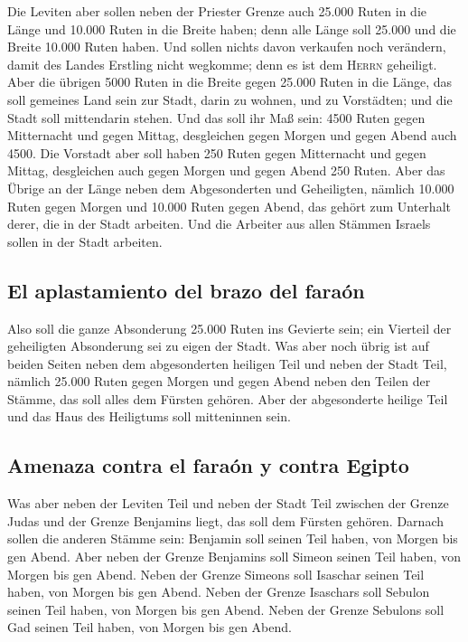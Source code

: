  Die Leviten aber sollen neben der Priester Grenze auch
25.000 Ruten in die Länge und 10.000 Ruten in die Breite haben; denn
alle Länge soll 25.000 und die Breite 10.000 Ruten haben.
 Und sollen nichts davon verkaufen noch verändern, damit
des Landes Erstling nicht wegkomme; denn es ist dem \textsc{Herrn}
geheiligt.  Aber die übrigen 5000 Ruten in die Breite
gegen 25.000 Ruten in die Länge, das soll gemeines Land sein zur Stadt,
darin zu wohnen, und zu Vorstädten; und die Stadt soll mittendarin
stehen.  Und das soll ihr Maß sein: 4500 Ruten gegen
Mitternacht und gegen Mittag, desgleichen gegen Morgen und gegen Abend
auch 4500.  Die Vorstadt aber soll haben 250 Ruten gegen
Mitternacht und gegen Mittag, desgleichen auch gegen Morgen und gegen
Abend 250 Ruten.  Aber das Übrige an der Länge neben dem
Abgesonderten und Geheiligten, nämlich 10.000 Ruten gegen Morgen und
10.000 Ruten gegen Abend, das gehört zum Unterhalt derer, die in der
Stadt arbeiten.  Und die Arbeiter aus allen Stämmen
Israels sollen in der Stadt arbeiten.

\hypertarget{el-aplastamiento-del-brazo-del-farauxf3n}{%
\subsection{El aplastamiento del brazo del
faraón}\label{el-aplastamiento-del-brazo-del-farauxf3n}}

 Also soll die ganze Absonderung 25.000 Ruten ins
Gevierte sein; ein Vierteil der geheiligten Absonderung sei zu eigen der
Stadt.  Was aber noch übrig ist auf beiden Seiten neben
dem abgesonderten heiligen Teil und neben der Stadt Teil, nämlich 25.000
Ruten gegen Morgen und gegen Abend neben den Teilen der Stämme, das soll
alles dem Fürsten gehören. Aber der abgesonderte heilige Teil und das
Haus des Heiligtums soll mitteninnen sein.

\hypertarget{amenaza-contra-el-farauxf3n-y-contra-egipto}{%
\subsection{Amenaza contra el faraón y contra
Egipto}\label{amenaza-contra-el-farauxf3n-y-contra-egipto}}

 Was aber neben der Leviten Teil und neben der Stadt Teil
zwischen der Grenze Judas und der Grenze Benjamins liegt, das soll dem
Fürsten gehören.  Darnach sollen die anderen Stämme sein:
Benjamin soll seinen Teil haben, von Morgen bis gen Abend.
 Aber neben der Grenze Benjamins soll Simeon seinen Teil
haben, von Morgen bis gen Abend.  Neben der Grenze
Simeons soll Isaschar seinen Teil haben, von Morgen bis gen Abend.
 Neben der Grenze Isaschars soll Sebulon seinen Teil
haben, von Morgen bis gen Abend.  Neben der Grenze
Sebulons soll Gad seinen Teil haben, von Morgen bis gen Abend.

